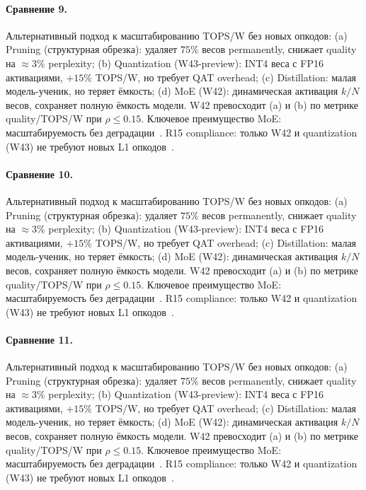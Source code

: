 \paragraph{Сравнение 9.} Альтернативный подход к масштабированию TOPS/W без новых опкодов: (a) Pruning (структурная обрезка): удаляет $75\%$ весов permanently, снижает quality на $\approx 3\%$ perplexity; (b) Quantization (W43-preview): INT4 веса с FP16 активациями, $+15\%$ TOPS/W, но требует QAT overhead; (c) Distillation: малая модель-ученик, но теряет ёмкость; (d) MoE (W42): динамическая активация $k/N$ весов, сохраняет полную ёмкость модели. W42 превосходит (a) и (b) по метрике quality/TOPS/W при $\rho \leq 0{.}15$. Ключевое преимущество MoE: масштабируемость без деградации~\cite{switch_transformer2021,mixtral2024}. R15 compliance: только W42 и quantization (W43) не требуют новых L1 опкодов~\cite{lee_gvsu_proof2021}.

\paragraph{Сравнение 10.} Альтернативный подход к масштабированию TOPS/W без новых опкодов: (a) Pruning (структурная обрезка): удаляет $75\%$ весов permanently, снижает quality на $\approx 3\%$ perplexity; (b) Quantization (W43-preview): INT4 веса с FP16 активациями, $+15\%$ TOPS/W, но требует QAT overhead; (c) Distillation: малая модель-ученик, но теряет ёмкость; (d) MoE (W42): динамическая активация $k/N$ весов, сохраняет полную ёмкость модели. W42 превосходит (a) и (b) по метрике quality/TOPS/W при $\rho \leq 0{.}15$. Ключевое преимущество MoE: масштабируемость без деградации~\cite{switch_transformer2021,mixtral2024}. R15 compliance: только W42 и quantization (W43) не требуют новых L1 опкодов~\cite{lee_gvsu_proof2021}.

\paragraph{Сравнение 11.} Альтернативный подход к масштабированию TOPS/W без новых опкодов: (a) Pruning (структурная обрезка): удаляет $75\%$ весов permanently, снижает quality на $\approx 3\%$ perplexity; (b) Quantization (W43-preview): INT4 веса с FP16 активациями, $+15\%$ TOPS/W, но требует QAT overhead; (c) Distillation: малая модель-ученик, но теряет ёмкость; (d) MoE (W42): динамическая активация $k/N$ весов, сохраняет полную ёмкость модели. W42 превосходит (a) и (b) по метрике quality/TOPS/W при $\rho \leq 0{.}15$. Ключевое преимущество MoE: масштабируемость без деградации~\cite{switch_transformer2021,mixtral2024}. R15 compliance: только W42 и quantization (W43) не требуют новых L1 опкодов~\cite{lee_gvsu_proof2021}.

